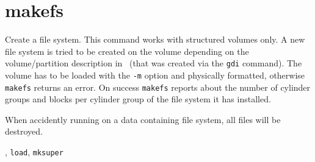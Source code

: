 \section{makefs}
\begin{man}
  \PP Create a file system.
  \DE This command works with structured volumes only.
             A new file system is tried to be created on the volume depending
             on the volume\slash partition description in \HEDI\ (that was
             created via the {\tt gdi} command). The volume has to be loaded with
             the {\tt -m} option and physically formatted, otherwise {\tt makefs} returns
             an error. On success {\tt makefs} reports about the number of cylinder
             groups and blocks per cylinder group of the file system it has
             installed.

             \begin{caution}
               When accidently running on a data containing file system, all
               files will be destroyed.
             \end{caution}
  , {\tt load}, {\tt mksuper}
\end{man}
